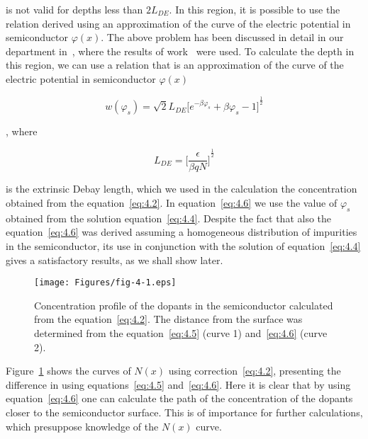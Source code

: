 is not valid for depths less than $2L_{DE}$. In this region, it is
possible to use the relation derived using an approximation of the
curve of the electric potential in semiconductor $\varphi(x)$. The
above problem has been discussed in detail in our department
in~\cite{4.13, 4.14}, where the results of work~\cite{4.9, 4.10, 4.11}
were used. To calculate the depth in this region, we can use a
relation that is an approximation of the curve of the electric
potential in semiconductor $\varphi(x)$~\cite{I.1}

\begin{equation}\label{eq:4.6}
  w(\varphi_{s})=\sqrt{2}L_{DE}{\big[e^{-\beta\varphi_{s}}+\beta\varphi_{s}-1\big]}^{\frac{1}{2}}
\end{equation}

, where

\begin{equation}\label{eq:4.7}
  L_{DE} = {\Big[\frac{\epsilon}{\beta qN}\Big]}^{\frac{1}{2}}
\end{equation}

is the extrinsic Debay length, which we used in the calculation the
concentration obtained from the equation~\ref{eq:4.2}.  In
equation~\ref{eq:4.6} we use the value of $\varphi_{s}$ obtained from
the solution equation~\ref{eq:4.4}. Despite the fact that also the
equation~\ref{eq:4.6} was derived assuming a homogeneous distribution
of impurities in the semiconductor, its use in conjunction with the
solution of equation~\ref{eq:4.4} gives a satisfactory results, as we
shall show later.

\begin{figure}[h!]\centering
  \begin{minipage}[c]{\myfiguresize}
    \begin{center}
      \texttt{[image: Figures/fig-4-1.eps]}%
      \caption[Concentration profile of dopants in a semiconductor
        calculated from the equation~\ref{eq:4.2}]{Concentration
        profile of the dopants in the semiconductor calculated from
        the equation~\ref{eq:4.2}. The distance from the surface was
        determined from the equation~\ref{eq:4.5} (curve 1)
        and~\ref{eq:4.6} (curve 2).}\label{fig:4.1}
    \end{center}
  \end{minipage}
\end{figure}

Figure~\ref{fig:4.1} shows the curves of $N(x)$ using
correction~\ref{eq:4.2}, presenting the difference in using
equations~\ref{eq:4.5} and~\ref{eq:4.6}. Here it is clear that by
using equation~\ref{eq:4.6} one can calculate the path of the
concentration of the dopants closer to the semiconductor surface.
This is of importance for further calculations, which presuppose
knowledge of the $N(x)$ curve.


